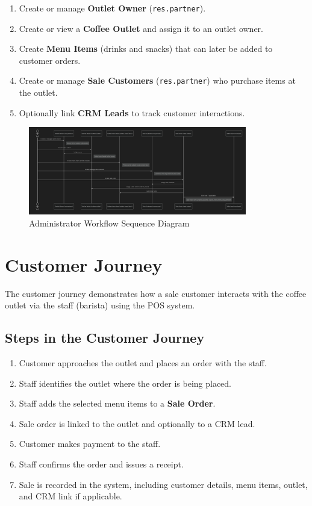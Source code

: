 \begin{enumerate}
    \item Create or manage \textbf{Outlet Owner} (\texttt{res.partner}).
    \item Create or view a \textbf{Coffee Outlet} and assign it to an outlet owner.
    \item Create \textbf{Menu Items} (drinks and snacks) that can later be added to customer orders.
    \item Create or manage \textbf{Sale Customers} (\texttt{res.partner}) who purchase items at the outlet.
    \item Optionally link \textbf{CRM Leads} to track customer interactions.
\end{enumerate}

\begin{figure}[H]
    \centering
    \includegraphics[width=0.85\textwidth]{diagrams/sequence.png}
    \caption{Administrator Workflow Sequence Diagram}
\end{figure}

\section*{Customer Journey}
The customer journey demonstrates how a sale customer interacts with the coffee outlet via the staff (barista) using the POS system.

\subsection*{Steps in the Customer Journey}
\begin{enumerate}
    \item Customer approaches the outlet and places an order with the staff.
    \item Staff identifies the outlet where the order is being placed.
    \item Staff adds the selected menu items to a \textbf{Sale Order}.
    \item Sale order is linked to the outlet and optionally to a CRM lead.
    \item Customer makes payment to the staff.
    \item Staff confirms the order and issues a receipt.
    \item Sale is recorded in the system, including customer details, menu items, outlet, and CRM link if applicable.
\end{enumerate}

